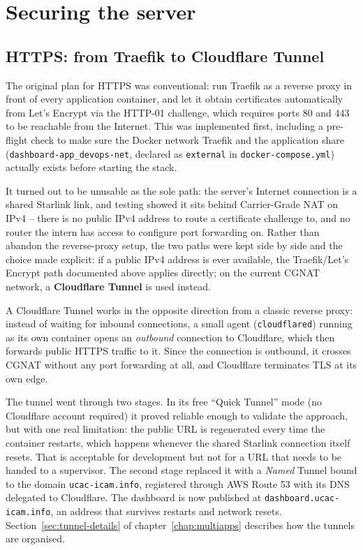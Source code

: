 \chapter{Securing the server}
\label{chap:securisation}

\section{HTTPS: from Traefik to Cloudflare Tunnel}
The original plan for HTTPS was conventional: run Traefik as a reverse proxy in front of every application container, and let it obtain certificates automatically from Let's Encrypt via the HTTP-01 challenge, which requires ports 80 and 443 to be reachable from the Internet. This was implemented first, including a pre-flight check to make sure the Docker network Traefik and the application share (\texttt{dashboard-app\_devops-net}, declared as \texttt{external} in \texttt{docker-compose.yml}) actually exists before starting the stack.

It turned out to be unusable as the sole path: the server's Internet connection is a shared Starlink link, and testing showed it sits behind Carrier-Grade NAT on IPv4 -- there is no public IPv4 address to route a certificate challenge to, and no router the intern has access to configure port forwarding on. Rather than abandon the reverse-proxy setup, the two paths were kept side by side and the choice made explicit: if a public IPv4 address is ever available, the Traefik/Let's Encrypt path documented above applies directly; on the current CGNAT network, a \textbf{Cloudflare Tunnel} is used instead.

A Cloudflare Tunnel works in the opposite direction from a classic reverse proxy: instead of waiting for inbound connections, a small agent (\texttt{cloudflared}) running as its own container opens an \emph{outbound} connection to Cloudflare, which then forwards public HTTPS traffic to it. Since the connection is outbound, it crosses CGNAT without any port forwarding at all, and Cloudflare terminates TLS at its own edge.

The tunnel went through two stages. In its free ``Quick Tunnel'' mode (no Cloudflare account required) it proved reliable enough to validate the approach, but with one real limitation: the public URL is regenerated every time the container restarts, which happens whenever the shared Starlink connection itself resets. That is acceptable for development but not for a URL that needs to be handed to a supervisor. The second stage replaced it with a \emph{Named} Tunnel bound to the domain \texttt{ucac-icam.info}, registered through AWS Route 53 with its DNS delegated to Cloudflare. The dashboard is now published at \texttt{dashboard.ucac-icam.info}, an address that survives restarts and network resets. Section~\ref{sec:tunnel-details} of chapter~\ref{chap:multiapps} describes how the tunnels are organised.

